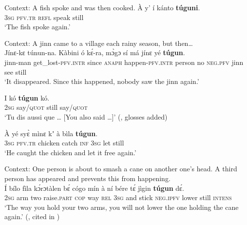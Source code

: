 \begin{exe}
	\ex\label{exAppendixBambaraIterative1}
	Context: A fish spoke and was then cooked.
	\exi{}\gll À	y’ í kánto \textbf{túguni}.\\
	3\textsc{sg} \textsc{pfv}.\textsc{tr} \textsc{refl} speak	 still\\
	\glt \lq The fish spoke again.' \parencite[118]{DombrowskyHahn2020}

	\ex
	\label{exAppendixBambaraIterative2}
	Context: A jinn came to a village each rainy season, but then…\\
	\gll Jínɛ-kɛ túnun-na. Kàbini ó kɛ́-ra, mɔ̀gɔ sí má jínɛ yé \textbf{túgun}.\\
	jinn-man get\_lost-\textsc{pfv}.\textsc{intr} since \textsc{anaph} happen-\textsc{pfv}.\textsc{intr} person no \textsc{neg}.\textsc{pfv} jinn see still\\
	\glt \lq It disappeared. Since this happened, nobody saw the jinn again.' \parencite[118]{DombrowskyHahn2020}

	\ex
	\label{exAppendixBambaraIterative3}
	\gll I kó \textbf{túgun} kó.\\
	2\textsc{sg} say/\textsc{quot} still say/\textsc{quot}\\
	\glt \lq Tu dis aussi que … [You also said …]\rq{ }(\cite[1003]{Dumestre2011}, glosses added)

	\ex\label{exAppendixBambaraRestitutive1}
	\gll À yé syɛ̀ mìnɛ kʼ à bìla \textbf{túgun}.\\
	3\textsc{sg} \textsc{pfv}.\textsc{tr} chicken catch \textsc{inf} 3\textsc{sg} let still\\
	\glt \lq He caught the chicken and let it free again.\rq{ }\parencite[118]{DombrowskyHahn2020}

	\ex\label{exAppendixBambaraRestitutive2}
	Context: One person is about to smash a cane on another one’s head. A third person has appeared and prevents this from happening.\\
	\gll Í bílo fìla kɔ́rɔtàlen bɛ́ cógo mín à ní bére tɛ́ jìgin \textbf{túgun} dɛ́.\\
	2\textsc{sg} arm two raise.\textsc{part} \textsc{cop} way \textsc{rel} 3\textsc{sg} and stick \textsc{neg}.\textsc{ipfv} lower still \textsc{intens}\\
	\glt \lq The way you hold your two arms, you will not lower the one holding the cane again.' (\cite[100]{Dumestre1979}, cited in \cite[118]{DombrowskyHahn2020})
\end{exe}

